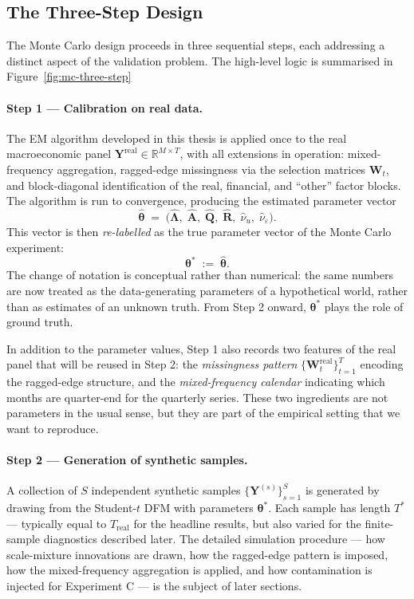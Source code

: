 \documentclass[11pt, a4paper, oneside]{article}
\newcommand{\R}{\mathbb{R}}
\newcommand{\mY}{\mathbf{Y}}
\newcommand{\mL}{\boldsymbol{\Lambda}}
\newcommand{\mA}{\mathbf{A}}
\newcommand{\mR}{\mathbf{R}}
\newcommand{\mQ}{\mathbf{Q}}
\newcommand{\btheta}{\boldsymbol{\theta}}
\begin{document}
\subsection{The Three-Step Design}
\label{subsec:mc-three-step}

The Monte Carlo design proceeds in three sequential steps, each
addressing a distinct aspect of the validation problem. The
high-level logic is summarised in
Figure~\ref{fig:mc-three-step}

\paragraph{Step 1 — Calibration on real data.}
The EM algorithm developed in this thesis is applied once to the
real macroeconomic panel $\mY^{\mathrm{real}} \in \R^{M \times T}$,
with all extensions in operation: mixed-frequency aggregation,
ragged-edge missingness via the selection matrices $\mathbf{W}_t$,
and block-diagonal identification of the real, financial, and
``other'' factor blocks. The algorithm is run to convergence,
producing the estimated parameter vector
\[
\hat{\btheta} \;=\;
\bigl(\hat{\mL},\; \hat{\mA},\; \hat{\mQ},\; \hat{\mR},\;
      \hat{\nu}_u,\; \hat{\nu}_\varepsilon \bigr).
\]
This vector is then \emph{re-labelled} as the true parameter vector
of the Monte Carlo experiment:
\[
\btheta^* \;:=\; \hat{\btheta}.
\]
The change of notation is conceptual rather than numerical: the same
numbers are now treated as the data-generating parameters of a
hypothetical world, rather than as estimates of an unknown truth.
From Step 2 onward, $\btheta^*$ plays the role of ground truth.

In addition to the parameter values, Step 1 also records two
features of the real panel that will be reused in Step 2: the
\emph{missingness pattern} $\{\mathbf{W}_t^{\mathrm{real}}\}_{t=1}^T$
encoding the ragged-edge structure, and the \emph{mixed-frequency
calendar} indicating which months are quarter-end for the quarterly
series. These two ingredients are not parameters in the usual sense,
but they are part of the empirical setting that we want to reproduce.

\paragraph{Step 2 — Generation of synthetic samples.}
A collection of $S$ independent synthetic samples
$\{\mY^{(s)}\}_{s=1}^{S}$ is generated by drawing from the
Student-$t$ DFM with parameters $\btheta^*$. Each sample has length
$T^*$ — typically equal to $T_{\mathrm{real}}$ for the headline
results, but also varied for the finite-sample diagnostics described later. The detailed simulation procedure
— how scale-mixture innovations are drawn, how the ragged-edge
pattern is imposed, how the mixed-frequency aggregation is applied,
and how contamination is injected for Experiment C — is the subject
of later sections.
\end{document}
